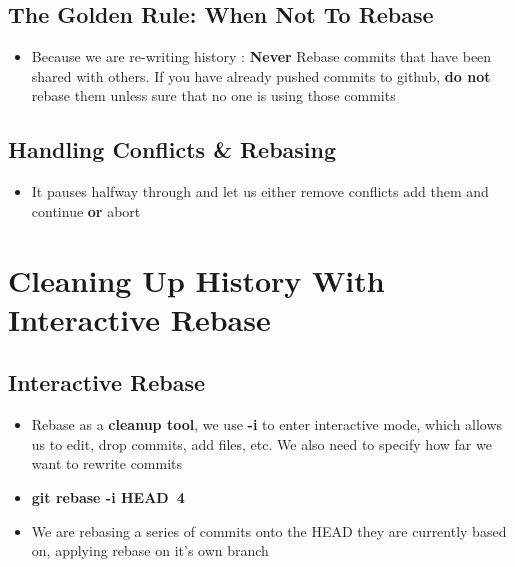 \documentclass{report}
\newcommand{\warning}{
	{\fontencoding{U}\fontfamily{futs}\selectfont\char 66\relax}
}
\begin{document}
\section{The Golden Rule: When Not To Rebase}

\begin{itemize}
	\item Because we are re-writing history : \warning \textbf{Never} Rebase commits that have been shared with others. If you have already pushed commits to github, \textbf{do not} rebase them unless sure that no one is using those commits
\end{itemize}

\section{Handling Conflicts \& Rebasing}
\begin{itemize}
	\item It pauses halfway through and let us either remove conflicts add them and continue \textbf{or} abort
\end{itemize}



\chapter{Cleaning Up History With Interactive Rebase}


\section{Interactive Rebase}

\begin{itemize}
	\item Rebase as a \textbf{cleanup tool}, we use \textbf{-i} to enter interactive mode, which allows us to edit, drop commits, add files, etc. We also need to specify how far we want to rewrite commits 
	\item \textbf{git rebase -i HEAD~4} 
	\item We are rebasing a series of commits onto the HEAD they are currently based on, applying rebase on it's own branch
\end{itemize}
\end{document}

